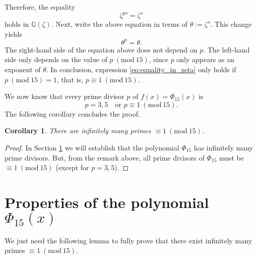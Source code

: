 \documentclass[a4paper, 12pt]{article}
\newtheorem{corollary}[theorem]{Corollary}
\theoremstyle{definition}
\theoremstyle{remark}
\newcommand{\Q}{\ensuremath{\mathbb{Q}}}
\newcommand{\Mod}[1]{\ (\mathrm{mod}\ #1)} %
\begin{document}
Therefore, the equality
\begin{equation*}
\zeta^{ps}=\zeta^{s}
\end{equation*}
holds in $\Q(\zeta)$. Next, write the above equation in terms of $\theta:=\zeta^{s}$. This change yields
\begin{equation}\label{eq:equality_in_zeta}
\theta^{p}=\theta.
\end{equation}
The right-hand side of the equation above does not depend on $p$. The left-hand side only depends on the value of $p\Mod{15}$, since $p$ only appears as an exponent of $\theta$. In conclusion, expression \eqref{eq:equality_in_zeta} only holds if $p \Mod{15}=1$, that is, $p\equiv 1\Mod{15}$.

We now know that every prime divisor $p$ of $f(x)=\Phi_{15}(x)$ is 
$$
p=3, 5 \quad \text{or  } p\equiv 1\Mod{15}.
$$
The following corollary concludes the proof.

\begin{corollary}
There are infinitely many primes $\equiv 1 \Mod{15}$.
\end{corollary}
\begin{proof}
In Section \ref{sec:properties} we will establish that the polynomial $\Phi_{15}$ has infinitely many prime divisors. But, from the remark above, all prime divisors of $\Phi_{15}$ must be $\equiv 1\Mod{15}$ (except for $p=3, 5$). 
\end{proof}

\section{Properties of the polynomial $\Phi_{15}(x)$}\label{sec:properties}

We just need the following lemma to fully prove that there exist infinitely many primes $\equiv 1 \Mod{15}$.
\end{document}
